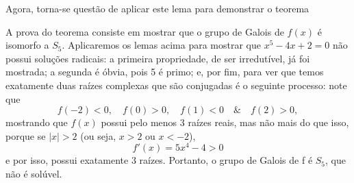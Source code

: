 \documentclass[../algebraIII_notes.tex]{subfiles}
\begin{document}
Agora, torna-se questão de aplicar este lema para demonstrar o teorema
\begin{proof*}
	A prova do teorema consiste em mostrar que o grupo de Galois de \(f(x)\) é isomorfo a \(S_5\). Aplicaremos os lemas acima para mostrar que \(x^{5}-4x+2 = 0\) não possui soluções radicais: a primeira propriedade, de ser irredutível, já foi mostrada; a segunda é óbvia, pois 5 é primo; e, por fim, para ver que temos exatamente duas raízes complexas que são conjugadas é o seguinte processo: note que
	\[
		f(-2) < 0, \quad f(0)> 0, \quad f(1) < 0 \quad\&\quad f(2) > 0,
	\]
	mostrando que \(f(x)\) possui pelo menos 3 raízes reais, mas não mais do que isso, porque se \(| x | > 2\) (ou seja, \(x > 2\) ou \(x < -2\)),
	\[
		f'(x) = 5x^{4} - 4 > 0
	\]
	e por isso, possui exatamente 3 raízes. Portanto, o grupo de Galois de f é \(S_5\), que não é solúvel. \qedsymbol
\end{proof*}
\end{document}
